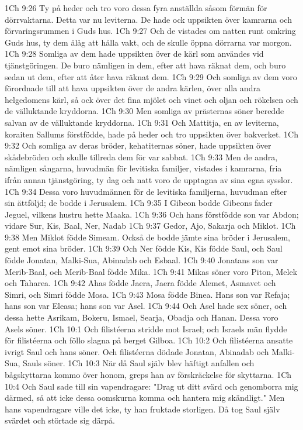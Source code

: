 1Ch 9:26  Ty på heder och tro voro dessa fyra anställda såsom förmän för dörrvaktarna. Detta var nu leviterna. De hade ock uppsikten över kamrarna och förvaringsrummen i Guds hus.
1Ch 9:27  Och de vistades om natten runt omkring Guds hus, ty dem ålåg att hålla vakt, och de skulle öppna dörrarna var morgon.
1Ch 9:28  Somliga av dem hade uppsikten över de kärl som användes vid tjänstgöringen. De buro nämligen in dem, efter att hava räknat dem, och buro sedan ut dem, efter att åter hava räknat dem.
1Ch 9:29  Och somliga av dem voro förordnade till att hava uppsikten över de andra kärlen, över alla andra helgedomens kärl, så ock över det fina mjölet och vinet och oljan och rökelsen och de välluktande kryddorna.
1Ch 9:30  Men somliga av prästernas söner beredde salvan av de välluktande kryddorna.
1Ch 9:31  Och Mattitja, en av leviterna, koraiten Sallums förstfödde, hade på heder och tro uppsikten över bakverket.
1Ch 9:32  Och somliga av deras bröder, kehatiternas söner, hade uppsikten över skådebröden och skulle tillreda dem för var sabbat.
1Ch 9:33  Men de andra, nämligen sångarna, huvudmän för levitiska familjer, vistades i kamrarna, fria ifrån annan tjänstgöring, ty dag och natt voro de upptagna av sina egna sysslor.
1Ch 9:34  Dessa voro huvudmännen för de levitiska familjerna, huvudman efter sin ättföljd; de bodde i Jerusalem.
1Ch 9:35  I Gibeon bodde Gibeons fader Jeguel, vilkens hustru hette Maaka.
1Ch 9:36  Och hans förstfödde son var Abdon; vidare Sur, Kis, Baal, Ner, Nadab
1Ch 9:37  Gedor, Ajo, Sakarja och Miklot.
1Ch 9:38  Men Miklot födde Simeam. Också de bodde jämte sina bröder i Jerusalem, gent emot sina bröder.
1Ch 9:39  Och Ner födde Kis, Kis födde Saul, och Saul födde Jonatan, Malki-Sua, Abinadab och Esbaal.
1Ch 9:40  Jonatans son var Merib-Baal, och Merib-Baal födde Mika.
1Ch 9:41  Mikas söner voro Piton, Melek och Taharea.
1Ch 9:42  Ahas födde Jaera, Jaera födde Alemet, Asmavet och Simri, och Simri födde Mosa.
1Ch 9:43  Mosa födde Binea. Hans son var Refaja; hans son var Eleasa; hans son var Asel.
1Ch 9:44  Och Asel hade sex söner, och dessa hette Asrikam, Bokeru, Ismael, Searja, Obadja och Hanan. Dessa voro Asels söner.
1Ch 10:1  Och filistéerna stridde mot Israel; och Israels män flydde för filistéerna och föllo slagna på berget Gilboa.
1Ch 10:2  Och filistéerna ansatte ivrigt Saul och hans söner. Och filistéerna dödade Jonatan, Abinadab och Malki-Sua, Sauls söner.
1Ch 10:3  När då Saul själv blev häftigt anfallen och bågskyttarna kommo över honom, greps han av förskräckelse för skyttarna.
1Ch 10:4  Och Saul sade till sin vapendragare: "Drag ut ditt svärd och genomborra mig därmed, så att icke dessa oomskurna komma och hantera mig skändligt." Men hans vapendragare ville det icke, ty han fruktade storligen. Då tog Saul själv svärdet och störtade sig därpå.
